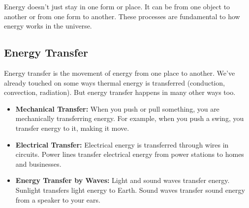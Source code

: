 \FloatBarrier
\1

Energy doesn't just stay in one form or place. It can be  from one object to another or  from one form to another.  These processes are fundamental to how energy works in the universe.

\subsection{Energy Transfer}

Energy transfer is the movement of energy from one place to another. We've already touched on some ways thermal energy is transferred (conduction, convection, radiation).  But energy transfer happens in many other ways too.

\begin{itemize}
    \item \textbf{Mechanical Transfer:}  When you push or pull something, you are mechanically transferring energy.  For example, when you push a swing, you transfer energy to it, making it move.
    \item \textbf{Electrical Transfer:}  Electrical energy is transferred through wires in circuits.  Power lines transfer electrical energy from power stations to homes and businesses.
    \item \textbf{Energy Transfer by Waves:} Light and sound waves transfer energy.  Sunlight transfers light energy to Earth.  Sound waves transfer sound energy from a speaker to your ears.
\end{itemize}

